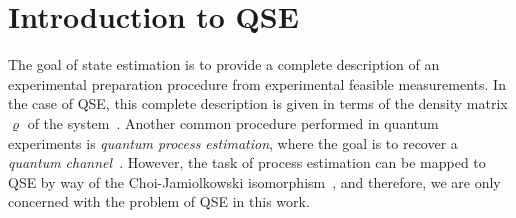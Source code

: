 \section{Introduction to QSE}
\label{sec:error.intro}

The goal of state estimation is to provide a complete description of an experimental preparation procedure from experimental feasible measurements.
In the case of QSE, this complete description is given in terms of the density matrix $\varrho$ of the system~\cite{Paris_2004_Quantum}.
Another common procedure performed in quantum experiments is \emph{quantum process estimation}, where the goal is to recover a \emph{quantum channel}~\cite{Nielsen_2010_Quantum}.
However, the task of process estimation can be mapped to QSE by way of the Choi-Jamiolkowski isomorphism~\cite{Nielsen_2010_Quantum,Jezek_2003_Quantum,Altepeter_2003_AncillaAssisted}, and therefore, we are only concerned with the problem of QSE in this work.

